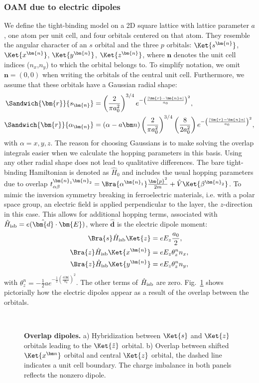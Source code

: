 \subsubsection{OAM due to electric dipoles \label{sec:tb_model}}
We define the tight-binding model on a 2D square lattice with lattice parameter $a$, one atom per unit cell, and four orbitals centered on that atom.
They resemble the angular character of an $s$ orbital and the three $p$ orbitals: $\Ket{s^{\bm{n}}}$, $\Ket{x^{\bm{n}}}$, $\Ket{y^{\bm{n}}}$, $\Ket{z^{\bm{n}}}$, where $\bm{n}$ denotes the unit cell indices ($n_x$,$n_y$) to which the orbital belongs to.
To simplify notation, we omit $\bm{n} = (0, 0)$ when writing the orbitals of the central unit cell.
Furthermore, we assume that these orbitals have a Gaussian radial shape:
\begin{align}
	\Sandwich{\bm{r}}{s_{\bm{n}}} &= \left(\frac{2}{\pi a_0^2}\right)^{3/4}e^{-\left(\frac{|\bm{r}-\bm{n}a|}{a_0}\right)^2},\\
\Sandwich{\bm{r}}{\alpha_{\bm{n}}} &= (\alpha - a\bm n)\left(\frac{2}{\pi a_0^2}\right)^{3/4}\left(\frac{8}{2a_0^2}\right) e^{-\left(\frac{|\bm{r}-\bm{n}a|}{a_0}\right)^2},
\end{align}
with $\alpha = x, y, z$.
The reason for choosing Gaussians is to make solving the overlap integrals easier when we calculate the hopping parameters in this basis.
Using any other radial shape does not lead to qualitative differences.
The bare tight-binding Hamiltonian is denoted as $\hat{H}_0$ and includes the usual hopping parameters due to overlap $t_{\alpha\beta}^{\bm{n}_1\bm{n}_2} = \Bra{\alpha^{\bm{n}_1}}\frac{\hat{\bm{p}}^2}{2m} + \hat{V}\Ket{\beta^{\bm{n}_2}}$.
To mimic the inversion symmetry breaking in ferroelectric materials, i.e. with a polar space group, an electric field is applied perpendicular to the layer, the $z$-direction in this case.
This allows for additional hopping terms, associated with $\hat{H}_{\rm isb} = e (\hat{\bm{d}}\cdot \bm{E})$, where $\hat{\bm{d}}$ is the electric dipole moment:
\begin{align}
	\label{eq:dipole}
	\Bra{s} \hat{H}_{\rm isb} \Ket{z} &=  e E_z \frac{a_0}{2},\\
	\Bra{z} \hat{H}_{\rm isb} \Ket{x^{\bm{n}}} &= e E_z \theta_z^n n_x,\\
	\Bra{z} \hat{H}_{\rm isb} \Ket{y^{\bm{n}}} &= e E_z \theta_z^n n_y,
\end{align}
with $\theta_z^n = -\frac{1}{2}ae^{-\frac{1}{2}\left(\frac{a|\bm{n}|}{a_0}\right)^2}$.
The other terms of $\hat{H}_{\rm isb}$ are zero.
Fig.~\ref{fig:Rashba_overlapdip} shows pictorially how the electric dipoles appear as a result of the overlap between the orbitals. 
\begin{figure}[t]
~\centering
{}\caption{\label{fig:Rashba_overlapdip} {\bf Overlap dipoles.} a) Hybridization between $\Ket{s}$ and $\Ket{z}$ orbitals leading to the $\Ket{\tilde z}$ orbital. b) Overlap between shifted $\Ket{x^{\bm n}}$ orbital and central $\Ket{z}$ orbital, the dashed line indicates a unit cell boundary. The charge imbalance in both panels reflects the nonzero dipole.}
\end{figure}
    
